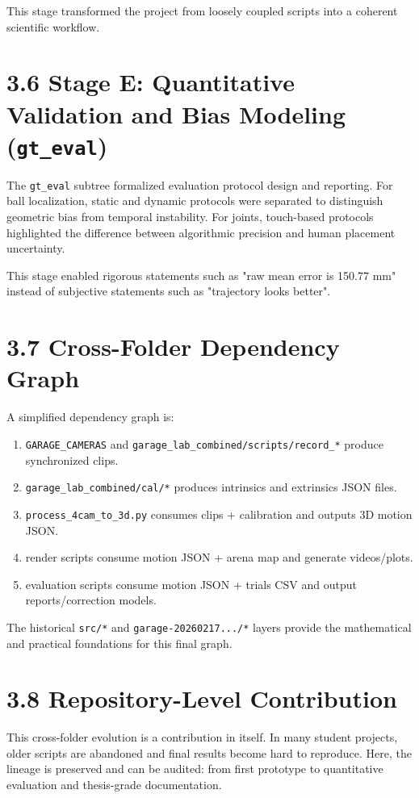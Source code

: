 This stage transformed the project from loosely coupled scripts into a coherent scientific workflow.

\section{3.6 Stage E: Quantitative Validation and Bias Modeling (\texttt{gt\_eval})}
The \texttt{gt\_eval} subtree formalized evaluation protocol design and reporting. For ball localization, static and dynamic protocols were separated to distinguish geometric bias from temporal instability. For joints, touch-based protocols highlighted the difference between algorithmic precision and human placement uncertainty.

This stage enabled rigorous statements such as "raw mean error is 150.77 mm" instead of subjective statements such as "trajectory looks better".

\section{3.7 Cross-Folder Dependency Graph}
A simplified dependency graph is:

\begin{enumerate}
  \item \texttt{GARAGE\_CAMERAS} and \texttt{garage\_lab\_combined/scripts/record\_*} produce synchronized clips.
  \item \texttt{garage\_lab\_combined/cal/*} produces intrinsics and extrinsics JSON files.
  \item \texttt{process\_4cam\_to\_3d.py} consumes clips + calibration and outputs 3D motion JSON.
  \item render scripts consume motion JSON + arena map and generate videos/plots.
  \item evaluation scripts consume motion JSON + trials CSV and output reports/correction models.
\end{enumerate}

The historical \texttt{src/*} and \texttt{garage-20260217.../*} layers provide the mathematical and practical foundations for this final graph.

\section{3.8 Repository-Level Contribution}
This cross-folder evolution is a contribution in itself. In many student projects, older scripts are abandoned and final results become hard to reproduce. Here, the lineage is preserved and can be audited: from first prototype to quantitative evaluation and thesis-grade documentation.



